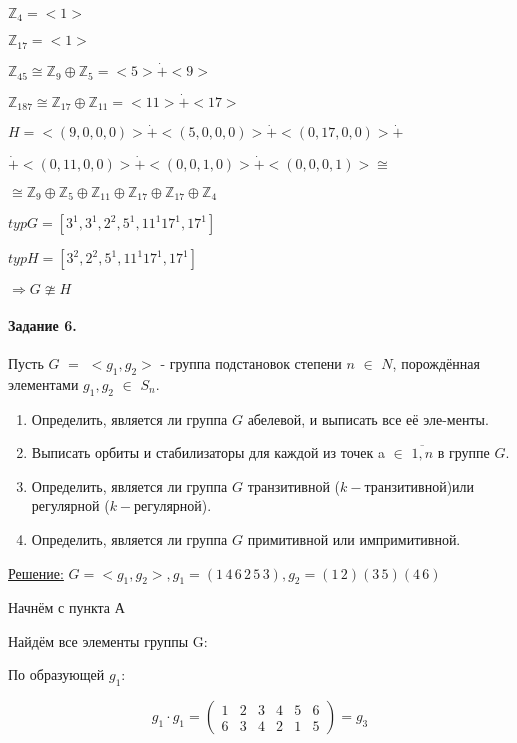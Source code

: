 \documentclass[utf8,14pt,a4paper,oneside,russian]{book}
\begin{document}
	$\mathbb {Z}_{4}=<1>$
	
	$\mathbb {Z}_{17}=<1>$
	
	$\mathbb {Z}_{45}\cong\mathbb {Z}_{9}\oplus\mathbb {Z}_{5}=<5>\dot{+}<9>$
	
	$\mathbb {Z}_{187}\cong\mathbb {Z}_{17}\oplus\mathbb {Z}_{11}=<11>\dot{+}<17>$
	
	\vspace{\baselineskip}
	
	$H =<(9,0,0,0)>\dot{+}<(5,0,0,0)>\dot{+}<(0,17,0,0)>\dot{+}$
	
	$\dot{+}<(0,11,0,0)>\dot{+}<(0,0,1,0)>\dot{+}<(0,0,0,1)> \cong $ 
	
	$\cong \mathbb {Z}_{9}\oplus\mathbb {Z}_{5}\oplus\mathbb {Z}_{11}\oplus\mathbb {Z}_{17}\oplus\mathbb {Z}_{17}\oplus\mathbb {Z}_{4}$
	
	\vspace{\baselineskip}
	
	$typG=[3^{1},3^{1},2^{2},5^{1},11^{1}17^{1},17^{1}]$ 
	
	$typH=[3^{2},2^{2},5^{1},11^{1}17^{1},17^{1}]$ 
	
	$\Rightarrow G\ncong H$
	\newpage
	\paragraph*{Задание 6.} Пусть $G$ $=$ $<g_{1},g_{2}>$ - группа подстановок степени $n$ $\in$ $N$, порождённая элементами $g_{1}, g_{2}$ $\in$  $S_{n}$.
	\begin{enumerate}[label=\asbuk{enumi})]
		\item Определить, является ли группа $G$ абелевой, и выписать все её эле-менты.
		\item Выписать орбиты и стабилизаторы для каждой из точек a $\in$ $\overline{1,n}$ в группе $G$.
		\item Определить, является ли группа $G$ транзитивной ($k-$транзитивной)или регулярной ($k-$регулярной).
		\item Определить, является ли группа $G$ примитивной или импримитивной.
	\end{enumerate}
	\underline{Решение:} $G=<g_{1},g_{2}>, g_{1}=(1\,4\,6\,2\,5\,3), g_{2}=(1\,2)(3\,5)(4\,6)$
	
	Начнём с пункта А
	
	Найдём все элементы группы G:
	
	По образующей $g_{1}$:
	
	\[ g_{1}\cdot g_{1} = \left( 
	\begin{array}{cccccc}
	1&2&3&4&5&6\\
	6&3&4&2&1&5
	\end{array} 
	\right) = g_{3} \]
	
\end{document}
